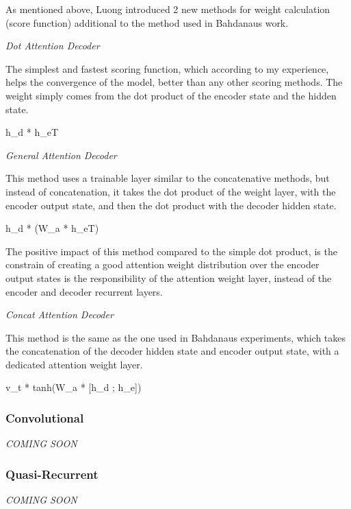 As mentioned above, Luong introduced 2 new methods for weight calculation (score function) additional to the method used in Bahdanau\textquotesingle{}s work.


\begin{DoxyEnumerate}
\item {\itshape Dot Attention Decoder}
\end{DoxyEnumerate}

The simplest and fastest scoring function, which according to my experience, helps the convergence of the model, better than any other scoring methods. The weight simply comes from the dot product of the encoder state and the hidden state. \begin{DoxyVerb}h_d * h_eT
\end{DoxyVerb}



\begin{DoxyEnumerate}
\item {\itshape General Attention Decoder}
\end{DoxyEnumerate}

This method uses a trainable layer similar to the concatenative methods, but instead of concatenation, it takes the dot product of the weight layer, with the encoder output state, and then the dot product with the decoder hidden state. \begin{DoxyVerb}h_d * (W_a * h_eT)
\end{DoxyVerb}


The positive impact of this method compared to the simple dot product, is the constrain of creating a good attention weight distribution over the encoder output states is the responsibility of the attention weight layer, instead of the encoder and decoder recurrent layers.


\begin{DoxyEnumerate}
\item {\itshape Concat Attention Decoder}
\end{DoxyEnumerate}

This method is the same as the one used in Bahdanau\textquotesingle{}s experiments, which takes the concatenation of the decoder hidden state and encoder output state, with a dedicated attention weight layer. \begin{DoxyVerb}v_t * tanh(W_a * [h_d ; h_e])
\end{DoxyVerb}


\subsubsection*{Convolutional}

{\itshape C\+O\+M\+I\+NG S\+O\+ON}

\subsubsection*{Quasi-\/\+Recurrent}

{\itshape C\+O\+M\+I\+NG S\+O\+ON} 